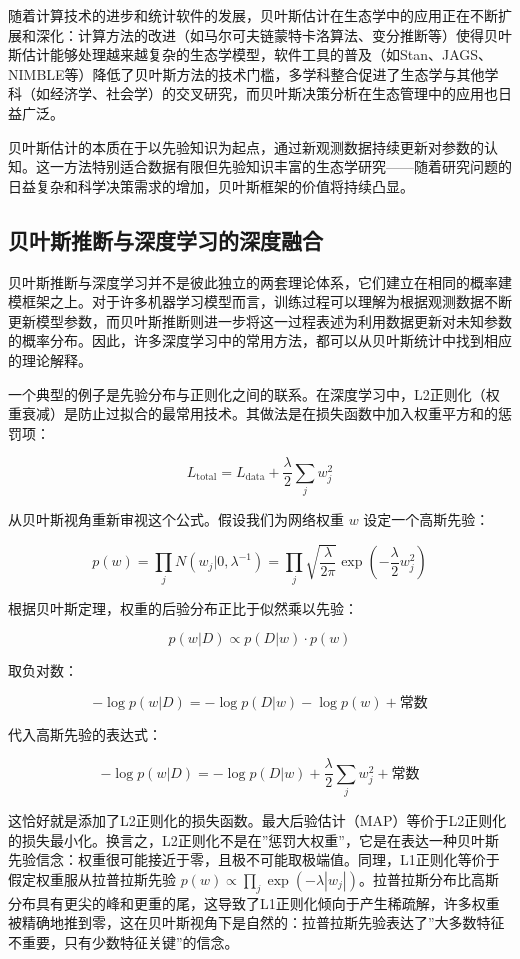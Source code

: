 \documentclass[
  twoside,12pt,fontset=none]{ctexbook}
\begin{document}
随着计算技术的进步和统计软件的发展，贝叶斯估计在生态学中的应用正在不断扩展和深化：计算方法的改进（如马尔可夫链蒙特卡洛算法、变分推断等）使得贝叶斯估计能够处理越来越复杂的生态学模型，软件工具的普及（如Stan、JAGS、NIMBLE等）降低了贝叶斯方法的技术门槛，多学科整合促进了生态学与其他学科（如经济学、社会学）的交叉研究，而贝叶斯决策分析在生态管理中的应用也日益广泛。

贝叶斯估计的本质在于以先验知识为起点，通过新观测数据持续更新对参数的认知。这一方法特别适合数据有限但先验知识丰富的生态学研究------随着研究问题的日益复杂和科学决策需求的增加，贝叶斯框架的价值将持续凸显。

\hypertarget{ux8d1dux53f6ux65afux63a8ux65adux4e0eux6df1ux5ea6ux5b66ux4e60ux7684ux6df1ux5ea6ux878dux5408}{%
\subsection{贝叶斯推断与深度学习的深度融合}\label{ux8d1dux53f6ux65afux63a8ux65adux4e0eux6df1ux5ea6ux5b66ux4e60ux7684ux6df1ux5ea6ux878dux5408}}

贝叶斯推断与深度学习并不是彼此独立的两套理论体系，它们建立在相同的概率建模框架之上。对于许多机器学习模型而言，训练过程可以理解为根据观测数据不断更新模型参数，而贝叶斯推断则进一步将这一过程表述为利用数据更新对未知参数的概率分布。因此，许多深度学习中的常用方法，都可以从贝叶斯统计中找到相应的理论解释。

一个典型的例子是先验分布与正则化之间的联系。在深度学习中，L2正则化（权重衰减）是防止过拟合的最常用技术。其做法是在损失函数中加入权重平方和的惩罚项：

\[L_{\text{total}} = L_{\text{data}} + \frac{\lambda}{2} \sum_{j} w_j^2\]

从贝叶斯视角重新审视这个公式。假设我们为网络权重 \(w\) 设定一个高斯先验：

\[p(w) = \prod_j N(w_j | 0, \lambda^{-1}) = \prod_j \sqrt{\frac{\lambda}{2\pi}} \exp\left(-\frac{\lambda}{2} w_j^2\right)\]

根据贝叶斯定理，权重的后验分布正比于似然乘以先验：

\[p(w|D) \propto p(D|w) \cdot p(w)\]

取负对数：

\[-\log p(w|D) = -\log p(D|w) - \log p(w) + \text{常数}\]

代入高斯先验的表达式：

\[-\log p(w|D) = -\log p(D|w) + \frac{\lambda}{2} \sum_j w_j^2 + \text{常数}\]

这恰好就是添加了L2正则化的损失函数。最大后验估计（MAP）等价于L2正则化的损失最小化。换言之，L2正则化不是在''惩罚大权重''，它是在表达一种贝叶斯先验信念：权重很可能接近于零，且极不可能取极端值。同理，L1正则化等价于假定权重服从拉普拉斯先验 \(p(w) \propto \prod_j \exp(-\lambda|w_j|)\)。拉普拉斯分布比高斯分布具有更尖的峰和更重的尾，这导致了L1正则化倾向于产生稀疏解，许多权重被精确地推到零，这在贝叶斯视角下是自然的：拉普拉斯先验表达了''大多数特征不重要，只有少数特征关键''的信念。
\end{document}
